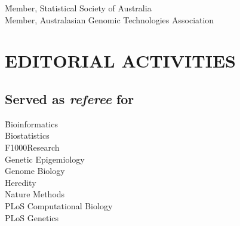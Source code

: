 \documentclass[11pt,letterpaper,pdf]{article}
\begin{document}
\begin{tabbing}
  \= Member, Statistical Society of Australia\\
  \> Member, Australasian Genomic Technologies Association\\
\end{tabbing}



\section*{EDITORIAL ACTIVITIES}

%

\subsection*{Served as \textit{referee} for}

\begin{tabbing}
  \=Bioinformatics\\
  \>Biostatistics\\
  \>F1000Research\\
  \>Genetic Epigemiology\\
  \>Genome Biology\\
  \>Heredity\\
  \>Nature Methods\\
  \>PLoS Computational Biology\\
  \>PLoS Genetics\\
\end{tabbing}

%
\end{document}
